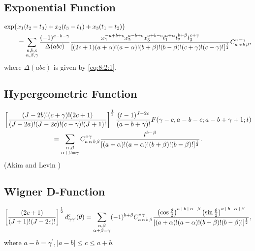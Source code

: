 \subsection{Exponential Function}\label{sec:8.8.3}
\begin{align}
\MoveEqLeft{\exp\{x_1(t_2-t_3)+x_2(t_3-t_1)+x_3(t_1-t_2)\}}\notag\\
  &=\sum_{\substack{a, b, c \\ \alpha, \beta, \gamma}} \frac{(-1)^{a-b-\gamma}}{\Delta(a b c)} \frac{x_1^{-a+b+c}x_2^{a-b+c}x_3^{a+b-c}t_1^{a+\alpha}t_2^{b+\beta}t_3^{c+\gamma}}{[(2 c+1)(a+\alpha)!(a-\alpha)!(b+\beta)!(b-\beta)!(c+\gamma)!(c-\gamma)!]^{\frac{1}{2}}} \clebsch{a}{\alpha}{b}{\beta}{c}{-\gamma}, \label{eq:8:8:4}
\end{align}
where $\Delta(a b c)$ is given by \eqref{eq:8:2:1}.

\subsection{Hypergeometric Function}\label{sec:8.8.4}
\begin{gather}
{\left[\frac{(J-2 b)!(c+\gamma)!(2 c+1)}{(J-2 a)!(J-2 c)!(c-\gamma)!(J+1)!}\right]^{\frac{1}{2}} \frac{(t-1)^{J-2 c}}{(a-b+\gamma)!} F(\gamma-c, a-b-c ; a-b+\gamma+1 ; t)}  \notag\\
=\sum_{\substack{\alpha, \beta \\
\alpha+\beta=\gamma}} C_{a\,\alpha\,b\,\beta}^{c\,\gamma} \frac{t^{b-\beta}}{[(a+\alpha)!(a-\alpha)!(b+\beta)!(b-\beta)!]^{\frac{1}{2}}}. \label{eq:8:8:5}
\end{gather}
(Akim and Levin \cite{ref046})

\subsection{Wigner D-Function}\label{sec:8.8.5}
\begin{equation}
\left[\frac{(2 c+1)}{(J+1)!(J-2 c)!}\right]^{\frac{1}{2}} d_{\gamma \gamma^{\prime}}^{c}(\theta)=\sum_{\substack{\alpha, \beta \\ \alpha+\beta=\gamma}}(-1)^{b+\beta} C_{a\,\alpha\,b\,\beta}^{c\,\gamma} \frac{\left(\cos \frac{\theta}{2}\right)^{a+b+\alpha-\beta}\left(\sin \frac{\theta}{2}\right)^{a+b-\alpha+\beta}}{[(a+\alpha)!(a-\alpha)!(b+\beta)!(b-\beta)!]^{\frac{1}{2}}}, \label{eq:8:8:6}
\end{equation}
where $a-b=\gamma^{\prime},|a-b| \leq c \leq a+b$.

